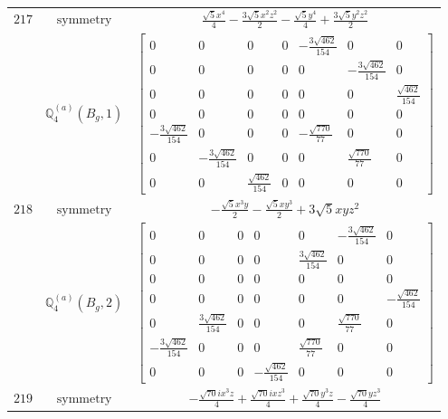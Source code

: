 \documentclass[fleqn,8pt,landscape]{jsarticle}
\begin{document}
\begin{longtable}{ccc}
$ 217 $ & $ \text{symmetry} $ & $ \frac{\sqrt{5} x^{4}}{4} - \frac{3 \sqrt{5} x^{2} z^{2}}{2} - \frac{\sqrt{5} y^{4}}{4} + \frac{3 \sqrt{5} y^{2} z^{2}}{2} $ \\
$  $ & $ \mathbb{Q}_{4}^{(a)}(B_{g},1) $ & $ \begin{bmatrix} 0 & 0 & 0 & 0 & - \frac{3 \sqrt{462}}{154} & 0 & 0 \\ 0 & 0 & 0 & 0 & 0 & - \frac{3 \sqrt{462}}{154} & 0 \\ 0 & 0 & 0 & 0 & 0 & 0 & \frac{\sqrt{462}}{154} \\ 0 & 0 & 0 & 0 & 0 & 0 & 0 \\ - \frac{3 \sqrt{462}}{154} & 0 & 0 & 0 & - \frac{\sqrt{770}}{77} & 0 & 0 \\ 0 & - \frac{3 \sqrt{462}}{154} & 0 & 0 & 0 & \frac{\sqrt{770}}{77} & 0 \\ 0 & 0 & \frac{\sqrt{462}}{154} & 0 & 0 & 0 & 0 \end{bmatrix} $ \\ \hline
$ 218 $ & $ \text{symmetry} $ & $ - \frac{\sqrt{5} x^{3} y}{2} - \frac{\sqrt{5} x y^{3}}{2} + 3 \sqrt{5} x y z^{2} $ \\
$  $ & $ \mathbb{Q}_{4}^{(a)}(B_{g},2) $ & $ \begin{bmatrix} 0 & 0 & 0 & 0 & 0 & - \frac{3 \sqrt{462}}{154} & 0 \\ 0 & 0 & 0 & 0 & \frac{3 \sqrt{462}}{154} & 0 & 0 \\ 0 & 0 & 0 & 0 & 0 & 0 & 0 \\ 0 & 0 & 0 & 0 & 0 & 0 & - \frac{\sqrt{462}}{154} \\ 0 & \frac{3 \sqrt{462}}{154} & 0 & 0 & 0 & \frac{\sqrt{770}}{77} & 0 \\ - \frac{3 \sqrt{462}}{154} & 0 & 0 & 0 & \frac{\sqrt{770}}{77} & 0 & 0 \\ 0 & 0 & 0 & - \frac{\sqrt{462}}{154} & 0 & 0 & 0 \end{bmatrix} $ \\ \hline
$ 219 $ & $ \text{symmetry} $ & $ - \frac{\sqrt{70} i x^{3} z}{4} + \frac{\sqrt{70} i x z^{3}}{4} + \frac{\sqrt{70} y^{3} z}{4} - \frac{\sqrt{70} y z^{3}}{4} $ \\

\end{longtable}
\end{document}
